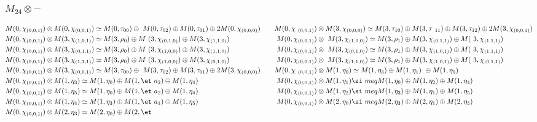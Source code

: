 \subsubsection{$M_24\otimes -$}
\begin{align*}
M(0,\chi_{(0,0,1)}) &\otimes M(0,\chi_{(0,0,1)}) \simeq M(0,\tau_{00}) \oplus \
M(0,\tau_{02}) \oplus M(0,\tau_{01}) \oplus 2 M(0,\chi_{(0,0,0)}) &&& M(0,\chi\
_{(0,0,1)}) &\otimes M(3,\chi_{(0,0,0)}) \simeq M(3,\tau_{10}) \oplus M(3,\tau\
_{11}) \oplus M(3,\tau_{12}) \oplus 2 M(3,\chi_{(0,0,1)})\\
M(0,\chi_{(0,0,1)}) &\otimes M(3,\chi_{(1,0,1)}) \simeq M(3,\rho_{0}) \oplus M\
(3,\chi_{(0,1,0)}) \oplus M(3,\chi_{(1,1,0)}) &&& M(0,\chi_{(0,0,1)}) &\otimes\
 M(3,\chi_{(1,0,0)}) \simeq M(3,\rho_{1}) \oplus M(3,\chi_{(0,1,1)}) \oplus M(\
3,\chi_{(1,1,1)})\\
M(0,\chi_{(0,0,1)}) &\otimes M(3,\chi_{(0,1,1)}) \simeq M(3,\rho_{0}) \oplus M\
(3,\chi_{(1,0,0)}) \oplus M(3,\chi_{(1,1,0)}) &&& M(0,\chi_{(0,0,1)}) &\otimes\
 M(3,\chi_{(0,1,0)}) \simeq M(3,\rho_{1}) \oplus M(3,\chi_{(1,0,1)}) \oplus M(\
3,\chi_{(1,1,1)})\\
M(0,\chi_{(0,0,1)}) &\otimes M(3,\chi_{(1,1,1)}) \simeq M(3,\rho_{0}) \oplus M\
(3,\chi_{(1,0,0)}) \oplus M(3,\chi_{(0,1,0)}) &&& M(0,\chi_{(0,0,1)}) &\otimes\
 M(3,\chi_{(1,1,0)}) \simeq M(3,\rho_{1}) \oplus M(3,\chi_{(1,0,1)}) \oplus M(\
3,\chi_{(0,1,1)})\\
M(0,\chi_{(0,0,1)}) &\otimes M(3,\chi_{(0,0,1)}) \simeq M(3,\tau_{00}) \oplus \
M(3,\tau_{02}) \oplus M(3,\tau_{01}) \oplus 2 M(3,\chi_{(0,0,0)}) &&& M(0,\chi\
_{(0,0,1)}) &\otimes M(1,\eta_{0}) \simeq M(1,\eta_{3}) \oplus M(1,\eta_{1}) \
\oplus M(1,\eta_{5})\\
M(0,\chi_{(0,0,1)}) &\otimes M(1,\eta_{3}) \simeq M(1,\eta_{0}) \oplus M(1,\et\
a_{2}) \oplus M(1,\eta_{4}) &&& M(0,\chi_{(0,0,1)}) &\otimes M(1,\eta_{1}) \si\
meq M(1,\eta_{0}) \oplus M(1,\eta_{2}) \oplus M(1,\eta_{4})\\
M(0,\chi_{(0,0,1)}) &\otimes M(1,\eta_{5}) \simeq M(1,\eta_{0}) \oplus M(1,\et\
a_{2}) \oplus M(1,\eta_{4}) &&& M(0,\chi_{(0,0,1)}) &\otimes M(1,\eta_{2}) \si\
meq M(1,\eta_{3}) \oplus M(1,\eta_{1}) \oplus M(1,\eta_{5})\\
M(0,\chi_{(0,0,1)}) &\otimes M(1,\eta_{4}) \simeq M(1,\eta_{3}) \oplus M(1,\et\
a_{1}) \oplus M(1,\eta_{5}) &&& M(0,\chi_{(0,0,1)}) &\otimes M(2,\eta_{0}) \si\
meq M(2,\eta_{3}) \oplus M(2,\eta_{1}) \oplus M(2,\eta_{5})\\
M(0,\chi_{(0,0,1)}) &\otimes M(2,\eta_{3}) \simeq M(2,\eta_{0}) \oplus M(2,\et\

\end{align*}

